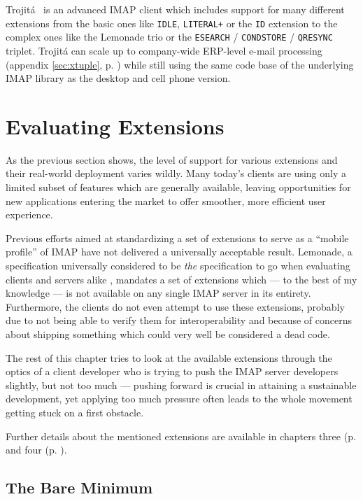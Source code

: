 \documentclass[trojita]{subfiles}
\begin{document}
Trojitá~\cite{trojita-website} is an advanced IMAP client which includes support for many different extensions from the
basic ones like {\tt IDLE}, {\tt LITERAL+} or the {\tt ID} extension to the complex ones like the Lemonade trio or the
{\tt ESEARCH} / {\tt CONDSTORE} / {\tt QRESYNC} triplet.  Trojitá can scale up to company-wide ERP-level e-mail
processing (appendix \ref{sec:xtuple}, p. \pageref{sec:xtuple}) while still using the same code base of
the underlying IMAP library as the desktop and cell phone version.

\section{Evaluating Extensions}

As the previous section shows, the level of support for various extensions and their real-world deployment varies
wildly.  Many today's clients are using only a limited subset of features which are generally available, leaving
opportunities for new applications entering the market to offer smoother, more efficient user experience.

Previous efforts aimed at standardizing a set of extensions to serve as a ``mobile profile'' of IMAP have not delivered
a universally acceptable result.  Lemonade, a specification universally considered to be {\em the} specification to go
when evaluating clients and servers alike \cite{isode-lemonade}, mandates a set of extensions which --- to the best of
my knowledge --- is not available on any single IMAP server in its entirety.  Furthermore, the clients do not even
attempt to use these extensions, probably due to not being able to verify them for interoperability and because of
concerns about shipping something which could very well be considered a dead code.

The rest of this chapter tries to look at the available extensions through the optics of a client developer who is
trying to push the IMAP server developers slightly, but not too much --- pushing forward is crucial in attaining a
sustainable development, yet applying too much pressure often leads to the whole movement getting stuck on a first
obstacle.

Further details about the mentioned extensions are available in chapters three (p.  \pageref{sec:imap-extensions} and
four (p. \pageref{sec:proposed-extensions}).

\subsection{The Bare Minimum}
\end{document}

